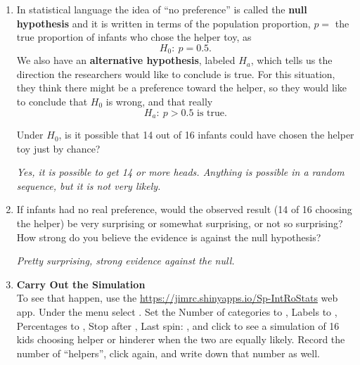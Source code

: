 \begin{enumerate}
\begin{key}
       {\it   That they are just picking one toy at random with no
         real preference for the helper or hinderer.}
\end{key}

   \item In statistical language the idea of ``no preference'' is
     called the {\bf null hypothesis}  and it is written in terms of
     the population proportion, $p=$ the true proportion of infants
     who chose the helper toy, as
      $$ H_0:\ p = 0.5.$$
     We also have an {\bf alternative hypothesis}, labeled $H_a$,
     which tells us the direction the researchers would like to
     conclude is true.  For this situation, they think there might be
     a preference toward the helper, so they would like to conclude
     that $H_0$ is wrong, and that really 
       $$H_a: \ p > 0.5 \mbox{ is true.}$$

     Under $H_0$,  is it possible that 14 out of 16
      infants could have chosen the helper toy just by chance? 
\begin{students}
  \vspace{1cm}
\end{students}

\begin{key}
{\it Yes, it is possible to get 14 or more heads. Anything is
  possible in a random sequence, but it is not very likely. }
\end{key}

\item If infants had no real preference, would the observed result (14
  of 16 choosing the helper) be very surprising or somewhat
  surprising, or not so surprising? How strong do you believe the
  evidence is against the null hypothesis?
\begin{students}
  \vspace{2cm}
\end{students}

\begin{key}
{\it Pretty surprising, strong evidence against the null.}
\end{key}


  \item         {\bf Carry Out the Simulation}\\
     To see that happen, use the
     \url{https://jimrc.shinyapps.io/Sp-IntRoStats}  web app. Under
     the  menu select .  Set the  
        Number of categories to , Labels to ,
        Percentages to , Stop after , Last spin: , and click  to
        see a simulation of 16 kids choosing helper or hinderer when
        the two are equally likely. Record the number of ``helpers'',
        click  again, and write down that number as well.
\begin{students}
  \vspace{1.5cm}
\end{students}


\end{enumerate}
